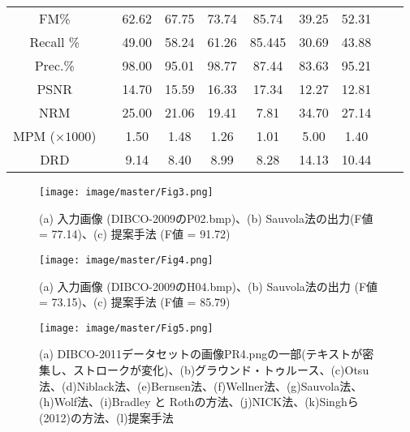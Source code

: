 \documentclass[uplatex, twocolumn,10pt]{jsarticle}
\begin{document}
\begin{table*}[tp]
\begin{tabular}{cccccccccc}
        \midrule
        FM\%               &  & 62.62                             & 67.75                            & 73.74                            & 85.74    & 39.25   & 52.31    \\
        Recall \%          &  & 49.00                             & 58.24                            & 61.26                            & 85.445   & 30.69   & 43.88    \\
        Prec.\%            &  & 98.00                             & 95.01                            & 98.77                            & 87.44    & 83.63   & 95.21    \\
        PSNR               &  & 14.70                             & 15.59                            & 16.33                            & 17.34    & 12.27   & 12.81    \\
        NRM                &  & 25.00                             & 21.06                            & 19.41                            & 7.81     & 34.70   & 27.14    \\
        MPM ($\times1000$) &  & 1.50                              & 1.48                             & 1.26                             & 1.01     & 5.00    & 1.40     \\
        DRD                &  & 9.14                              & 8.40                             & 8.99                             & 8.28     & 14.13   & 10.44    \\
        \bottomrule
    \end{tabular}
\end{table*}

\begin{figure}[tp]
    \begin{center}
        \texttt{[image: image/master/Fig3.png]}
        \caption{(a) 入力画像 (DIBCO-2009のP02.bmp)、(b) Sauvola法の出力(F値 = 77.14)、(c) 提案手法 (F値 = 91.72)}
        \label{fig3}
    \end{center}
\end{figure}

\begin{figure}[tp]
    \begin{center}
        \texttt{[image: image/master/Fig4.png]}
        \caption{(a) 入力画像 (DIBCO-2009のH04.bmp)、(b) Sauvola法の出力 (F値 = 73.15)、(c) 提案手法 (F値 = 85.79)}
        \label{fig4}
    \end{center}
\end{figure}

\begin{figure}[tp]
    \begin{center}
        \texttt{[image: image/master/Fig5.png]}
        \caption{(a) DIBCO-2011データセットの画像PR4.pngの一部(テキストが密集し、ストロークが変化)、(b)グラウンド・トゥルース、(c)Otsu法、(d)Niblack法、(e)Bernsen法、(f)Wellner法、(g)Sauvola法、(h)Wolf法、(i)Bradley と Rothの方法、(j)NICK法、(k)Singhら(2012)の方法、(l)提案手法}
        \label{fig5}
    \end{center}
\end{figure}
\end{document}
